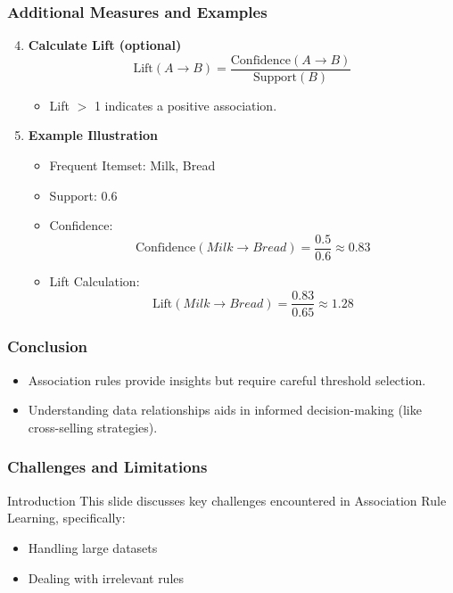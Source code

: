 \documentclass{beamer}
\begin{document}
\begin{frame}[fragile]
    \frametitle{Additional Measures and Examples}
    \begin{enumerate}
        \setcounter{enumi}{3}
        \item \textbf{Calculate Lift (optional)}
            \begin{equation}
                \text{Lift}(A \to B) = \frac{\text{Confidence}(A \to B)}{\text{Support}(B)}
            \end{equation}
            \begin{itemize}
                \item Lift $>$ 1 indicates a positive association.
            \end{itemize}

        \item \textbf{Example Illustration}
            \begin{itemize}
                \item Frequent Itemset: {Milk, Bread}
                \item Support: 0.6 
                \item Confidence:
                \[
                \text{Confidence}({Milk} \to {Bread}) = \frac{0.5}{0.6} \approx 0.83
                \]
                \item Lift Calculation:
                \[
                \text{Lift}({Milk} \to {Bread}) = \frac{0.83}{0.65} \approx 1.28
                \]
            \end{itemize}
    \end{enumerate}
\end{frame}

\begin{frame}[fragile]
    \frametitle{Conclusion}
    \begin{itemize}
        \item Association rules provide insights but require careful threshold selection.
        \item Understanding data relationships aids in informed decision-making (like cross-selling strategies).
    \end{itemize}
\end{frame}

\begin{frame}
    \frametitle{Challenges and Limitations}
    \begin{block}{Introduction}
        This slide discusses key challenges encountered in Association Rule Learning, specifically:
        \begin{itemize}
            \item Handling large datasets
            \item Dealing with irrelevant rules
        \end{itemize}
    \end{block}
\end{frame}
\end{document}

